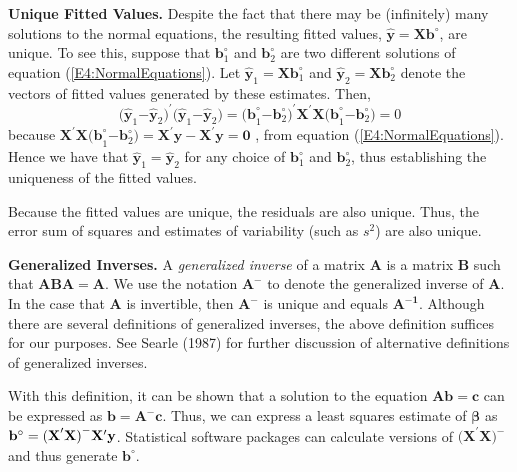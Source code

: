 \textbf{Unique Fitted Values.} Despite the fact that there may be
(infinitely) many solutions to the normal equations, the resulting fitted
values, $\mathbf{\hat{y}}=\mathbf{Xb}^{\circ }$, are unique. To see this,
suppose that $\mathbf{b}_{1}^{\circ }$ and $\mathbf{b}_{2}^{\circ }$ are two
different solutions of equation (\ref{E4:NormalEquations}). Let $\mathbf{\hat{y}}_{1}=\mathbf{Xb%
}_{1}^{\circ }$ and $\mathbf{\hat{y}}_{2}=\mathbf{Xb}_{2}^{\circ }$
denote the vectors of fitted values generated by these estimates.
Then,
\begin{equation*}
\mathbf{(\hat{y}}_{1}\mathbf{-\hat{y}}_{2}\mathbf{)}^{\prime }\mathbf{(\hat{y%
}}_{1}\mathbf{-\hat{y}}_{2}\mathbf{)}=\mathbf{(b}_{1}^{\circ }\mathbf{-b}%
_{2}^{\circ }\mathbf{)}^{\prime }\mathbf{X}^{\prime
}\mathbf{X(b}_{1}^{\circ }\mathbf{-b}_{2}^{\circ }\mathbf{)}=0
\end{equation*}
because $\mathbf{X}^{\prime }\mathbf{X(b}_{1}^{\circ
}\mathbf{-b}_{2}^{\circ
}\mathbf{)}=\mathbf{X}^{\prime }\mathbf{y-X}^{\prime }\mathbf{y}=\mathbf{0}$%
, from equation (\ref{E4:NormalEquations}). Hence we have that $\mathbf{\hat{y}}_{1}\mathbf{=%
\hat{y}}_{2}$ for any choice of $\mathbf{b}_{1}^{\circ }$ and $\mathbf{b}%
_{2}^{\circ }$, thus establishing the uniqueness of the fitted values.

\qquad Because the fitted values are unique, the residuals are also
unique. Thus, the error sum of squares and estimates of variability
(such as $s^2$) are also unique.

\textbf{Generalized Inverses.} A \emph{generalized inverse} of a
matrix $\mathbf{A}$
is a matrix $\mathbf{B}$ such that $\mathbf{ABA=A}$. We use the notation $%
\mathbf{A}^{\mathbf{-}}$ to denote the generalized inverse of $\mathbf{A}$.
In the case that $\mathbf{A}$ is invertible, then $\mathbf{A}^{\mathbf{-}}$
is unique and equals $\mathbf{A}^{\mathbf{-1}}$. Although there are several
definitions of generalized inverses, the above definition suffices for our
purposes. See Searle (1987) for further discussion of alternative
definitions of generalized inverses.

\qquad With this definition, it can be shown that a solution to the
equation $\mathbf{Ab=c}$ can be expressed as $\mathbf{b=A}^{-}
\mathbf{c}$. Thus, we
can express a least squares estimate of $\boldsymbol \beta$ as $\mathbf{b}^{%
\mathbf{\circ }}=\mathbf{(X}^{\prime }\mathbf{X)}^{\mathbf{-}}\mathbf{X}%
^{\prime }\mathbf{y}$. Statistical software packages can calculate versions
of $\mathbf{(X}^{\prime }\mathbf{X)}^{\mathbf{-}}$ and thus generate $%
\mathbf{b}^{\mathbf{\circ }}$.

